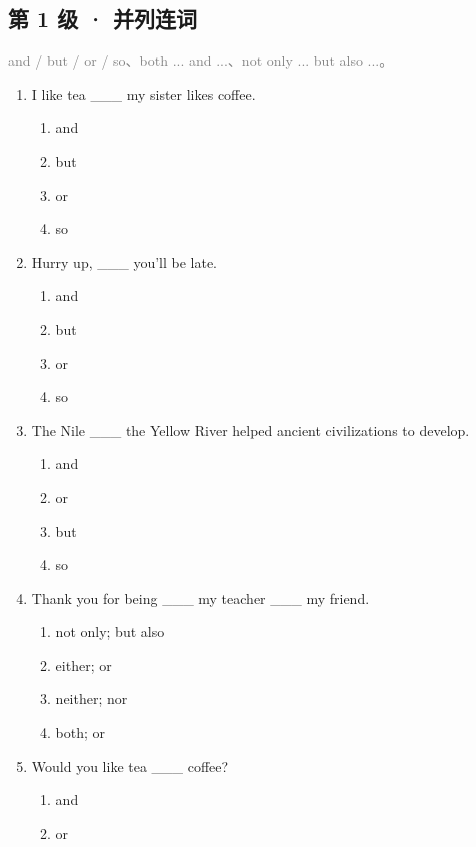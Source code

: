\documentclass[11pt,a4paper]{ctexart}
\begin{document}
\subsection*{第 1 级 · 并列连词}
\noindent\textcolor{gray}{and / but / or / so、both ... and ...、not only ... but also ...。}\par\smallskip
\begin{enumerate}[leftmargin=*,itemsep=4pt]
\item I like tea \_\_\_ my sister likes coffee.
\begin{enumerate}[label=\Alph*.,leftmargin=2em,itemsep=1pt,topsep=2pt]
\item and
\item but
\item or
\item so
\end{enumerate}
\item Hurry up, \_\_\_ you’ll be late.
\begin{enumerate}[label=\Alph*.,leftmargin=2em,itemsep=1pt,topsep=2pt]
\item and
\item but
\item or
\item so
\end{enumerate}
\item The Nile \_\_\_ the Yellow River helped ancient civilizations to develop.
\begin{enumerate}[label=\Alph*.,leftmargin=2em,itemsep=1pt,topsep=2pt]
\item and
\item or
\item but
\item so
\end{enumerate}
\item Thank you for being \_\_\_ my teacher \_\_\_ my friend.
\begin{enumerate}[label=\Alph*.,leftmargin=2em,itemsep=1pt,topsep=2pt]
\item not only; but also
\item either; or
\item neither; nor
\item both; or
\end{enumerate}
\item Would you like tea \_\_\_ coffee?
\begin{enumerate}[label=\Alph*.,leftmargin=2em,itemsep=1pt,topsep=2pt]
\item and
\item or

\end{enumerate}
\end{enumerate}
\end{document}
